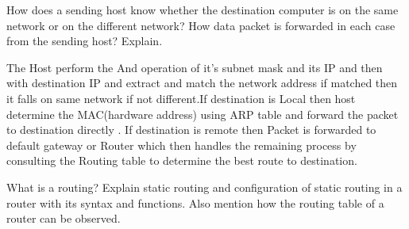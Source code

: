 \documentclass[a4paper,11pt]{article}
\begin{document}

\begin{Q}
      {
            How does a sending host know whether the destination computer is on the same network or on the different network? How data packet is forwarded in each case from the sending host? Explain.
      }
\end{Q}

\begin{A}
      {
            The Host perform the And operation of it's subnet mask and its IP and then with destination IP and extract and match the network address if matched then it falls on same network if not different.If destination is Local then  host determine the MAC(hardware address) using ARP table and forward the packet to destination directly . If destination is remote then Packet is forwarded to default gateway or Router which then handles the remaining  process by consulting the Routing table to determine the best route to destination.
      }
\end{A}

\pagebreak

\begin{Q}
      {
            What is a routing? Explain static routing and configuration of static routing in a router with its syntax and functions. Also mention how the routing table of a router can be observed.
      }
\end{Q}
\end{document}

